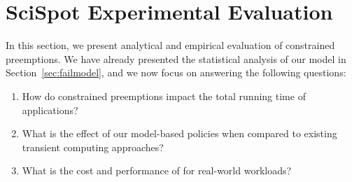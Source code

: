 \vspace*{\subsecspace}
\section{SciSpot Experimental Evaluation}
\label{sec:eval}

%


In this section, we present analytical and empirical evaluation of constrained preemptions.
We have already presented the statistical analysis of our model in Section~\ref{sec:failmodel}, and we now focus on answering the following questions: 

\begin{enumerate}
\item How do constrained preemptions impact the total running time of applications?

\item  What is the effect of our model-based policies when compared to existing transient computing approaches?


\item What is the cost and performance of \sysname for real-world workloads? 
  
\end{enumerate}


